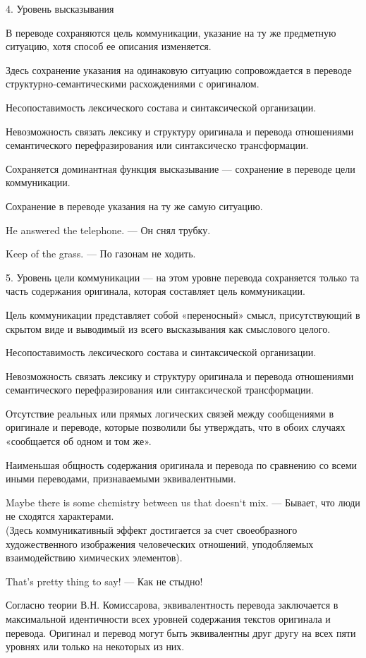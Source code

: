 4. Уровень высказывания 

В переводе сохраняются цель коммуникации, указание на ту же предметную ситуацию, хотя способ ее описания изменяется. 

Здесь сохранение указания на одинаковую ситуацию сопровождается в переводе структурно-семантическими расхождениями с оригиналом. 

Несопоставимость лексического состава и синтаксической организации.

Невозможность связать лексику и структуру оригинала и перевода отношениями семантического перефразирования или синтаксическо трансформации.

Сохраняется доминантная функция высказывание --- сохранение в переводе цели коммуникации.

Сохранение в переводе указания на ту же самую ситуацию.

He answered the telephone. --- Он снял трубку. 

Keep of the grass. --- По газонам не ходить.

5. Уровень цели коммуникации --- на этом уровне перевода сохраняется только та часть содержания оригинала, которая составляет цель коммуникации. 

Цель коммуникации представляет собой «переносный» смысл, присутствующий в скрытом виде и выводимый из всего высказывания как смыслового целого.

Несопоставимость лексического состава и синтаксической организации.

Невозможность связать лексику и структуру оригинала и перевода отношениями семантического перефразирования или синтаксической трансформации.

Отсутствие реальных или прямых логических связей между сообщениями в оригинале и переводе, которые позволили бы утверждать, что в обоих случаях «сообщается об одном и том же».

Наименьшая общность содержания оригинала и перевода по сравнению со всеми иными переводами, признаваемыми эквивалентными.

Maybe there is some chemistry between us that doesn`t mix. --- Бывает, что люди не сходятся характерами. 
\\
(Здесь коммуникативный эффект достигается за счет своеобразного художественного изображения человеческих отношений, уподобляемых взаимодействию химических элементов). 

That’s pretty thing to say! --- Как не стыдно!

Согласно теории В.Н. Комиссарова, эквивалентность перевода заключается в максимальной идентичности всех уровней содержания текстов оригинала и перевода. Оригинал и перевод могут быть эквивалентны друг другу на всех пяти уровнях или только на некоторых из них.

